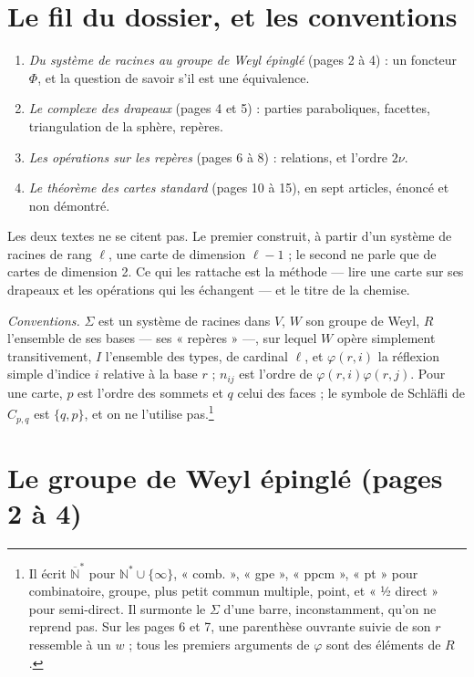 \documentclass[11pt,a4paper]{article}
\begin{document}
\section*{Le fil du dossier, et les conventions}

\begin{enumerate}
\item[1.] \emph{Du système de racines au groupe de Weyl épinglé} (pages 2 à 4) :
un foncteur $\Phi$, et la question de savoir s'il est une équivalence.
\item[2.] \emph{Le complexe des drapeaux} (pages 4 et 5) : parties paraboliques,
facettes, triangulation de la sphère, repères.
\item[3.] \emph{Les opérations sur les repères} (pages 6 à 8) : relations, et
l'ordre $2\nu$.
\item[4.] \emph{Le théorème des cartes standard} (pages 10 à 15), en sept
articles, énoncé et non démontré.
\end{enumerate}

Les deux textes ne se citent pas. Le premier construit, à partir d'un système
de racines de rang $\ell$, une carte de dimension $\ell - 1$ ; le second ne
parle que de cartes de dimension 2. Ce qui les rattache est la méthode ---
lire une carte sur ses drapeaux et les opérations qui les échangent --- et le
titre de la chemise.

\emph{Conventions.} $\Sigma$ est un système de racines dans $V$, $W$ son groupe
de Weyl, $R$ l'ensemble de ses bases --- ses « repères » ---, sur lequel $W$
opère simplement transitivement, $I$ l'ensemble des types, de cardinal
$\ell$, et $\varphi(r, i)$ la réflexion simple d'indice $i$ relative à la base
$r$ ; $n_{ij}$ est l'ordre de $\varphi(r,i)\varphi(r,j)$. Pour une carte, $p$
est l'ordre des sommets et $q$ celui des faces ; le symbole de Schläfli de
$C_{p,q}$ est $\{q, p\}$, et on ne l'utilise pas.\footnote{Il écrit
$\overline{\mathbb{N}}^{*}$ pour $\mathbb{N}^{*} \cup \{\infty\}$, « comb. »,
« gpe », « ppcm », « pt » pour combinatoire, groupe, plus petit commun
multiple, point, et « ½ direct » pour semi-direct. Il surmonte le $\Sigma$
d'une barre, inconstamment, qu'on ne reprend pas. Sur les pages 6 et 7, une
parenthèse ouvrante suivie de son $r$ ressemble à un $w$ ; tous les premiers
arguments de $\varphi$ sont des éléments de $R$.}

\section*{Le groupe de Weyl épinglé (pages 2 à 4)}
\end{document}
